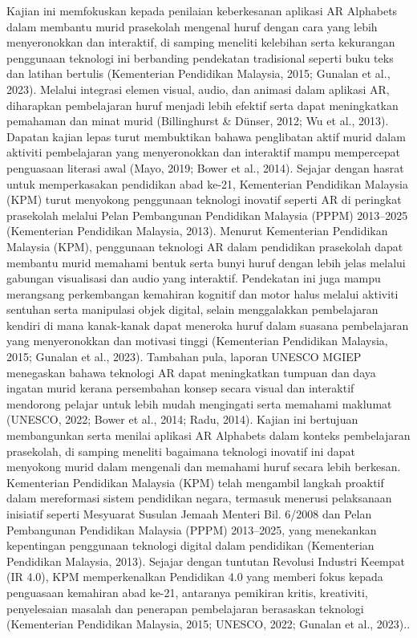 Kajian ini memfokuskan kepada penilaian keberkesanan aplikasi AR Alphabets dalam membantu murid prasekolah mengenal huruf dengan cara yang lebih menyeronokkan dan interaktif, di samping meneliti kelebihan serta kekurangan penggunaan teknologi ini berbanding pendekatan tradisional seperti buku teks dan latihan bertulis (Kementerian Pendidikan Malaysia, 2015; Gunalan et al., 2023). Melalui integrasi elemen visual, audio, dan animasi dalam aplikasi AR, diharapkan pembelajaran huruf menjadi lebih efektif serta dapat meningkatkan pemahaman dan minat murid (Billinghurst & Dünser, 2012; Wu et al., 2013). Dapatan kajian lepas turut membuktikan bahawa penglibatan aktif murid dalam aktiviti pembelajaran yang menyeronokkan dan interaktif mampu mempercepat penguasaan literasi awal (Mayo, 2019; Bower et al., 2014). Sejajar dengan hasrat untuk memperkasakan pendidikan abad ke-21, Kementerian Pendidikan Malaysia (KPM) turut menyokong penggunaan teknologi inovatif seperti AR di peringkat prasekolah melalui Pelan Pembangunan Pendidikan Malaysia (PPPM) 2013–2025 (Kementerian Pendidikan Malaysia, 2013).
Menurut Kementerian Pendidikan Malaysia (KPM), penggunaan teknologi AR dalam pendidikan prasekolah dapat membantu murid memahami bentuk serta bunyi huruf dengan lebih jelas melalui gabungan visualisasi dan audio yang interaktif. Pendekatan ini juga mampu merangsang perkembangan kemahiran kognitif dan motor halus melalui aktiviti sentuhan serta manipulasi objek digital, selain menggalakkan pembelajaran kendiri di mana kanak-kanak dapat meneroka huruf dalam suasana pembelajaran yang menyeronokkan dan motivasi tinggi (Kementerian Pendidikan Malaysia, 2015; Gunalan et al., 2023). Tambahan pula, laporan UNESCO MGIEP menegaskan bahawa teknologi AR dapat meningkatkan tumpuan dan daya ingatan murid kerana persembahan konsep secara visual dan interaktif mendorong pelajar untuk lebih mudah mengingati serta memahami maklumat (UNESCO, 2022; Bower et al., 2014; Radu, 2014).
Kajian ini bertujuan membangunkan serta menilai aplikasi AR Alphabets dalam konteks pembelajaran prasekolah, di samping meneliti bagaimana teknologi inovatif ini dapat menyokong murid dalam mengenali dan memahami huruf secara lebih berkesan. Kementerian Pendidikan Malaysia (KPM) telah mengambil langkah proaktif dalam mereformasi sistem pendidikan negara, termasuk menerusi pelaksanaan inisiatif seperti Mesyuarat Susulan Jemaah Menteri Bil. 6/2008 dan Pelan Pembangunan Pendidikan Malaysia (PPPM) 2013–2025, yang menekankan kepentingan penggunaan teknologi digital dalam pendidikan (Kementerian Pendidikan Malaysia, 2013). Sejajar dengan tuntutan Revolusi Industri Keempat (IR 4.0), KPM memperkenalkan Pendidikan 4.0 yang memberi fokus kepada penguasaan kemahiran abad ke-21, antaranya pemikiran kritis, kreativiti, penyelesaian masalah dan penerapan pembelajaran berasaskan teknologi (Kementerian Pendidikan Malaysia, 2015; UNESCO, 2022; Gunalan et al., 2023)..
